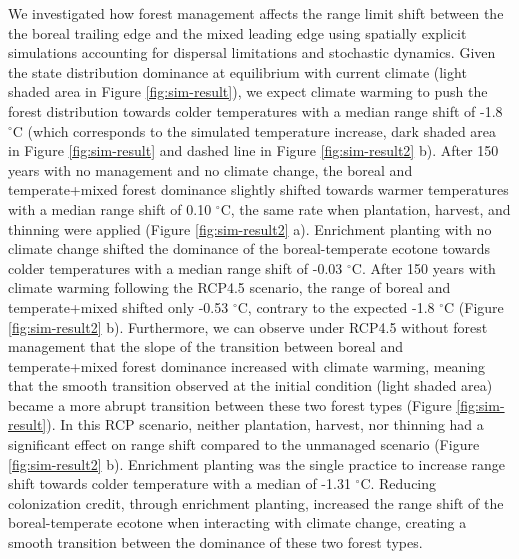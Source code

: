 We investigated how forest management affects the range limit shift
between the the boreal trailing edge and the mixed leading edge using
spatially explicit simulations accounting for dispersal limitations and
stochastic dynamics. Given the state distribution dominance at
equilibrium with current climate (light shaded area in Figure
\ref{fig:sim-result}), we expect climate warming to push the forest
distribution towards colder temperatures with a median range shift of
-1.8 \(^{\circ}\)C (which corresponds to the simulated temperature
increase, dark shaded area in Figure \ref{fig:sim-result} and dashed
line in Figure \ref{fig:sim-result2} b). After 150 years with no
management and no climate change, the boreal and temperate+mixed forest
dominance slightly shifted towards warmer temperatures with a median
range shift of 0.10 \(^{\circ}\)C, the same rate when plantation,
harvest, and thinning were applied (Figure \ref{fig:sim-result2} a).
Enrichment planting with no climate change shifted the dominance of the
boreal-temperate ecotone towards colder temperatures with a median range
shift of -0.03 \(^{\circ}\)C. After 150 years with climate warming
following the RCP4.5 scenario, the range of boreal and temperate+mixed
shifted only -0.53 \(^{\circ}\)C, contrary to the expected -1.8
\(^{\circ}\)C (Figure \ref{fig:sim-result2} b). Furthermore, we can
observe under RCP4.5 without forest management that the slope of the
transition between boreal and temperate+mixed forest dominance increased
with climate warming, meaning that the smooth transition observed at the
initial condition (light shaded area) became a more abrupt transition
between these two forest types (Figure \ref{fig:sim-result}). In this
RCP scenario, neither plantation, harvest, nor thinning had a
significant effect on range shift compared to the unmanaged scenario
(Figure \ref{fig:sim-result2} b). Enrichment planting was the single
practice to increase range shift towards colder temperature with a
median of -1.31 \(^{\circ}\)C. Reducing colonization credit, through
enrichment planting, increased the range shift of the boreal-temperate
ecotone when interacting with climate change, creating a smooth
transition between the dominance of these two forest types.

